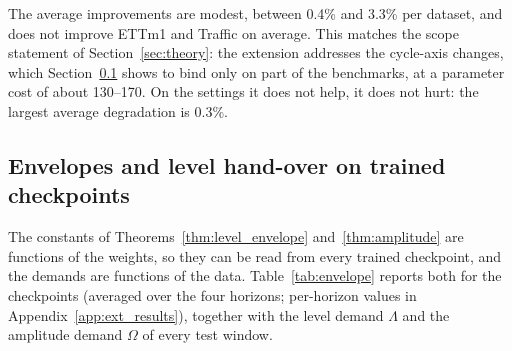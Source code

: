 {The average improvements are modest, between 0.4\% and 3.3\% per dataset, and \sysLA does not improve ETTm1 and Traffic on average. This matches the scope statement of Section~\ref{sec:theory}: the extension addresses the cycle-axis changes, which Section~\ref{sec:exp_theory} shows to bind only on part of the benchmarks, at a parameter cost of about 130--170. On the settings it does not help, it does not hurt: the largest average degradation is 0.3\%.

\subsection{Envelopes and level hand-over on trained checkpoints}
\label{sec:exp_theory}

The constants of Theorems~\ref{thm:level_envelope} and~\ref{thm:amplitude} are functions of the weights, so they can be read from every trained checkpoint, and the demands are functions of the data. Table~\ref{tab:envelope} reports both for the \sysLA checkpoints (averaged over the four horizons; per-horizon values in Appendix~\ref{app:ext_results}), together with the level demand $\Lambda$ and the amplitude demand $\Omega$ of every test window.

\begin{table}[t]
\end{table}

}
